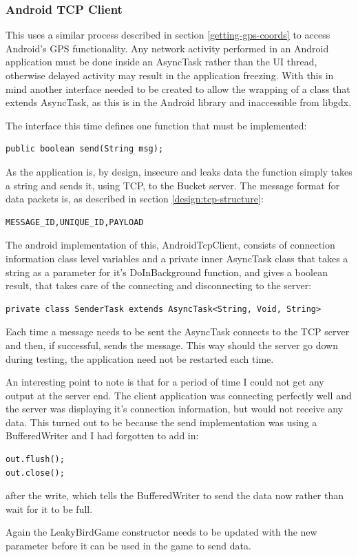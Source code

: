 \subsubsection{Android TCP Client}
This uses a similar process described in section \ref{getting-gps-coords} to access Android’s GPS functionality. Any network activity performed in an Android application must be done inside an AsyncTask rather than the UI thread, otherwise delayed activity may result in the application freezing. With this in mind another interface needed to be created to allow the wrapping of a class that extends AsyncTask, as this is in the Android library and inaccessible from libgdx.

The interface this time defines one function that must be implemented:
\begin{verbatim}
public boolean send(String msg);
\end{verbatim}

As the application is, by design, insecure and leaks data the function simply takes a string and sends it, using TCP, to the Bucket server. The message format for data packets is, as described in section \ref{design:tcp-structure}:
\begin{verbatim}
MESSAGE_ID,UNIQUE_ID,PAYLOAD
\end{verbatim}

The android implementation of this, AndroidTcpClient, consists of connection information class level variables and a private inner AsyncTask class that takes a string as a parameter for it’s DoInBackground function, and gives a boolean result, that takes care of the connecting and disconnecting to the server:

\begin{verbatim}
private class SenderTask extends AsyncTask<String, Void, String>
\end{verbatim}

Each time a message needs to be sent the AsyncTask connects to the TCP server and then, if successful, sends the message. This way should the server go down during testing, the application need not be restarted each time.
 
An interesting point to note is that for a period of time I could not get any output at the server end. The client application was connecting perfectly well and the server was displaying it’s connection information, but would not receive any data. This turned out to be because the send implementation was using a BufferedWriter and I had forgotten to add in:

\begin{verbatim}
out.flush();
out.close();
\end{verbatim}

after the write, which tells the BufferedWriter to send the data now rather than wait for it to be full.

Again the LeakyBirdGame constructor needs to be updated with the new parameter before it can be used in the game to send data.
\clearpage